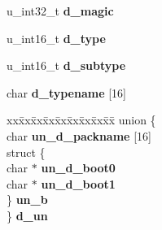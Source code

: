 \begin{DoxyCompactItemize}
\item 
\mbox{\label{structdisklabel_ab0580251dc18386ef40930cb4dc1a8a1}} 
u\+\_\+int32\+\_\+t {\bfseries d\+\_\+magic}
\item 
\mbox{\label{structdisklabel_ae5e9ad8ed6ded42500647b8394129f8b}} 
u\+\_\+int16\+\_\+t {\bfseries d\+\_\+type}
\item 
\mbox{\label{structdisklabel_ab5ccbe4deb8ba6579c8e3707392b26f9}} 
u\+\_\+int16\+\_\+t {\bfseries d\+\_\+subtype}
\item 
\mbox{\label{structdisklabel_a4f0f898a2110cb65fd71aaef171df0d4}} 
char {\bfseries d\+\_\+typename} \mbox{[}16\mbox{]}
\item 
\mbox{\label{structdisklabel_aead1128f19b6f1054bf011f0bf24c873}} 
\begin{tabbing}
xx\=xx\=xx\=xx\=xx\=xx\=xx\=xx\=xx\=\kill
union \{\\
\>char {\bfseries un\_d\_packname} \mbox{[}16\mbox{]}\\
\>struct \{\\
\>\>char $\ast$ {\bfseries un\_d\_boot0}\\
\>\>char $\ast$ {\bfseries un\_d\_boot1}\\
\>\} {\bfseries un\_b}\\
\} {\bfseries d\_un}\\


\end{tabbing}
\end{DoxyCompactItemize}
